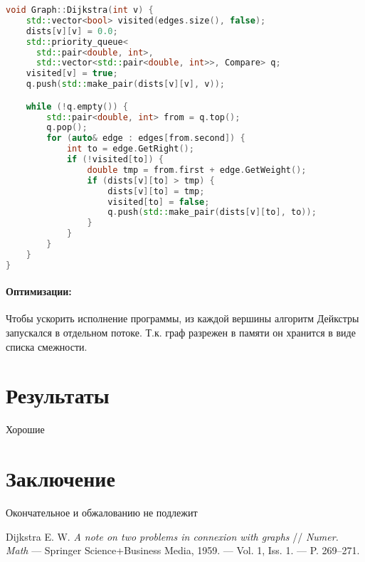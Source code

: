 \documentclass[12pt]{article}
\begin{document}

\begin{lstlisting}[language=C++]
void Graph::Dijkstra(int v) {
    std::vector<bool> visited(edges.size(), false);
    dists[v][v] = 0.0;
    std::priority_queue<
      std::pair<double, int>,
      std::vector<std::pair<double, int>>, Compare> q;
    visited[v] = true;
    q.push(std::make_pair(dists[v][v], v));

    while (!q.empty()) {
        std::pair<double, int> from = q.top();
        q.pop();
        for (auto& edge : edges[from.second]) {
            int to = edge.GetRight();
            if (!visited[to]) {
                double tmp = from.first + edge.GetWeight();
                if (dists[v][to] > tmp) {
                    dists[v][to] = tmp;
                    visited[to] = false;
                    q.push(std::make_pair(dists[v][to], to));
                }
            }
        }
    }
}
\end{lstlisting}

\paragraph{Оптимизации:}
Чтобы ускорить исполнение программы, из каждой
вершины алгоритм Дейкстры запускался в отдельном
потоке. Т.к. граф разрежен в памяти он хранится в
виде списка смежности.

\section{Результаты}
Хорошие

\section{Заключение}
Окончательное и обжалованию не подлежит

\begin{thebibliography}{9}
Dijkstra E. W. \textit{A note on two problems in connexion with graphs} //
\textit{Numer. Math} — Springer Science+Business Media, 1959.
— Vol. 1, Iss. 1. — P. 269–271.
\end{thebibliography}
\end{document}
